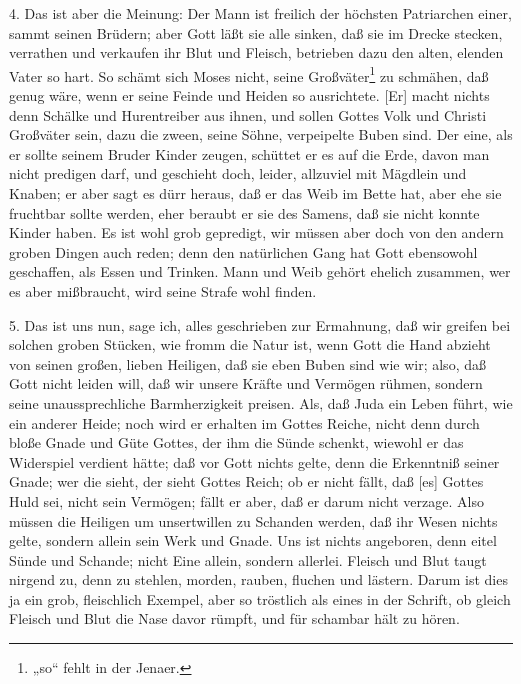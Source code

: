 4. Das ist aber die Meinung: Der Mann ist freilich der höchsten Patriarchen einer, sammt seinen Brüdern; aber Gott läßt sie alle sinken, daß sie im Drecke stecken, verrathen und verkaufen ihr Blut und Fleisch, betrieben dazu den alten, elenden Vater so hart. So schämt sich Moses nicht, seine Großväter\footnote{„so“ fehlt in der Jenaer.} zu schmähen, daß genug wäre, wenn er seine Feinde und Heiden so ausrichtete. [Er] macht nichts denn Schälke und Hurentreiber aus ihnen, und sollen Gottes Volk und Christi Großväter sein, dazu die zween, seine Söhne, verpeipelte Buben sind. Der eine, als er sollte seinem Bruder Kinder zeugen, schüttet er es auf die Erde, davon man nicht predigen darf, und geschieht doch, leider, allzuviel mit Mägdlein und Knaben; er aber sagt es dürr heraus, daß er das Weib im Bette hat, aber ehe sie fruchtbar sollte werden, eher beraubt er sie des Samens, daß sie nicht konnte Kinder haben. Es ist wohl grob gepredigt, wir müssen aber doch von den andern groben Dingen auch reden; denn den natürlichen Gang hat Gott ebensowohl geschaffen, als Essen und Trinken. Mann und Weib gehört ehelich zusammen, wer es aber mißbraucht, wird seine Strafe wohl finden.

5. Das ist uns nun, sage ich, alles geschrieben zur Ermahnung, daß wir greifen bei solchen groben Stücken, wie fromm die Natur ist, wenn Gott die Hand abzieht von seinen großen, lieben Heiligen, daß sie eben Buben sind wie wir; also, daß Gott nicht leiden will, daß wir unsere Kräfte und Vermögen rühmen, sondern seine unaussprechliche Barmherzigkeit preisen. Als, daß Juda ein Leben führt, wie ein anderer Heide; noch wird er erhalten im Gottes Reiche, nicht denn durch bloße Gnade und Güte Gottes, der ihm die Sünde schenkt, wiewohl er das Widerspiel verdient hätte; daß vor Gott nichts gelte, denn die Erkenntniß seiner Gnade; wer die sieht, der sieht Gottes Reich; ob er nicht fällt, daß [es] Gottes Huld sei, nicht sein Vermögen; fällt er aber, daß er darum nicht verzage. Also müssen die Heiligen um unsertwillen zu Schanden werden, daß ihr Wesen nichts gelte, sondern allein sein Werk und Gnade. Uns ist nichts angeboren, denn eitel Sünde und Schande; nicht Eine allein, sondern allerlei. Fleisch und Blut taugt nirgend zu, denn zu stehlen, morden, rauben, fluchen und lästern. Darum ist dies ja ein grob, fleischlich Exempel, aber so tröstlich als eines in der Schrift, ob gleich Fleisch und Blut die Nase davor rümpft, und für schambar hält zu hören.

